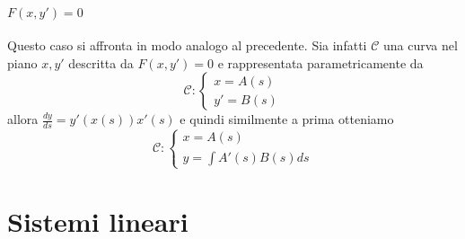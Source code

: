 \paragraph{\(F{(x, y')} = 0\)} Questo caso si affronta in modo analogo al
precedente. Sia infatti \(\mathcal{C}\) una curva nel piano \(x, y'\) descritta
da \(F{(x, y')} = 0\) e rappresentata parametricamente da
\[
  \mathcal{C} : \begin{cases}
      x = A{(s)} \\
      y' = B{(s)}
  \end{cases}
\]
allora \(\frac{dy}{ds} = y'{(x{(s)})}x'{(s)}\) e quindi similmente a prima
otteniamo
\[
  \mathcal{C} : \begin{cases}
      x = A{(s)} \\
      y = \int A'{(s)} B{(s)} ds
  \end{cases}
\]
\section{Sistemi lineari}
